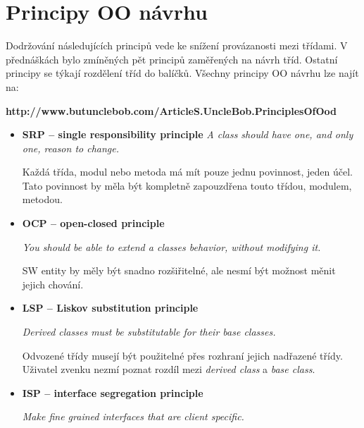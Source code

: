 \documentclass{szzclass}
\begin{document}
\section{Principy OO návrhu}

Dodržování následujících principů vede ke snížení provázanosti mezi třídami.
V přednáškách bylo zmíněných pět principů zaměřených na návrh tříd.
Ostatní principy se týkají rozdělení tříd do balíčků.
Všechny principy OO návrhu lze najít na:

\textbf{http://www.butunclebob.com/ArticleS.UncleBob.PrinciplesOfOod}

\begin{itemize}
      \item \textbf{SRP -- single responsibility principle}
      \textit{A class should have one, and only one, reason to change.}

      Každá třída, modul nebo metoda má mít pouze jednu povinnost, jeden účel.
      Tato povinnost by měla být kompletně zapouzdřena touto třídou, modulem, metodou.

      \item \textbf{OCP -- open-closed principle}

      \textit{You should be able to extend a classes behavior, without modifying it.}

      SW entity by měly být snadno rozšiřitelné, ale nesmí být možnost měnit jejich chování.

      \item \textbf{LSP -- Liskov substitution principle}

      \textit{Derived classes must be substitutable for their base classes.}

      Odvozené třídy musejí být použitelné přes rozhraní jejich nadřazené třídy.
      Uživatel zvenku nezmí poznat rozdíl mezi \textit{derived class} a \textit{base class}.

      \item \textbf{ISP -- interface segregation principle}

      \textit{Make fine grained interfaces that are client specific.}


\end{itemize}
\end{document}
